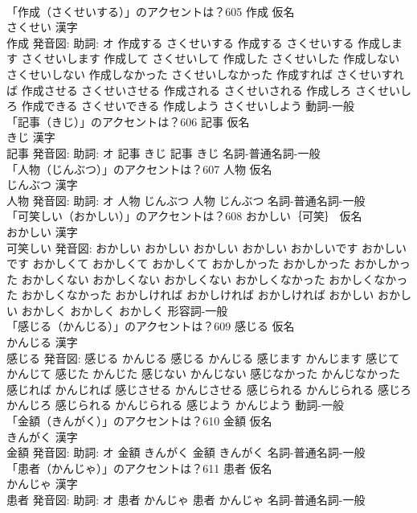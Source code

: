 \documentclass[8pt]{extreport}
\begin{document}
\begin{CJK}{UTF8}{min}
\\	「作成（さくせいする）」のアクセントは？605	作成 仮名　
\\	さくせい 漢字　
\\	作成 発音図: 助詞: オ	作成する さくせいする		作成する さくせいする 作成します さくせいします 作成して さくせいして 作成した さくせいした 作成しない さくせいしない 作成しなかった さくせいしなかった 作成すれば さくせいすれば 作成させる さくせいさせる 作成される さくせいされる 作成しろ さくせいしろ 作成できる さくせいできる 作成しよう さくせいしよう				動詞-一般 
\\	「記事（きじ）」のアクセントは？606	記事 仮名　
\\	きじ 漢字　
\\	記事 発音図: 助詞: オ	記事 きじ		記事 きじ				名詞-普通名詞-一般 
\\	「人物（じんぶつ）」のアクセントは？607	人物 仮名　
\\	じんぶつ 漢字　
\\	人物 発音図: 助詞: オ	人物 じんぶつ		人物 じんぶつ				名詞-普通名詞-一般 
\\	「可笑しい（おかしい）」のアクセントは？608	おかしい｛可笑｝ 仮名　
\\	おかしい 漢字　
\\	可笑しい 発音図:	おかしい おかしい		おかしい おかしい おかしいです おかしいです おかしくて おかしくて おかしくて おかしかった おかしかった おかしかった おかしくない おかしくない おかしくない おかしくなかった おかしくなかった おかしくなかった おかしければ おかしければ おかしければ おかしい おかしい おかしく おかしく おかしく				形容詞-一般 
\\	「感じる（かんじる）」のアクセントは？609	感じる 仮名　
\\	かんじる 漢字　
\\	感じる 発音図:	感じる かんじる		感じる かんじる 感じます かんじます 感じて かんじて 感じた かんじた 感じない かんじない 感じなかった かんじなかった 感じれば かんじれば 感じさせる かんじさせる 感じられる かんじられる 感じろ かんじろ 感じられる かんじられる 感じよう かんじよう				動詞-一般 
\\	「金額（きんがく）」のアクセントは？610	金額 仮名　
\\	きんがく 漢字　
\\	金額 発音図: 助詞: オ	金額 きんがく		金額 きんがく				名詞-普通名詞-一般 
\\	「患者（かんじゃ）」のアクセントは？611	患者 仮名　
\\	かんじゃ 漢字　
\\	患者 発音図: 助詞: オ	患者 かんじゃ		患者 かんじゃ				名詞-普通名詞-一般 

\end{CJK}
\end{document}
